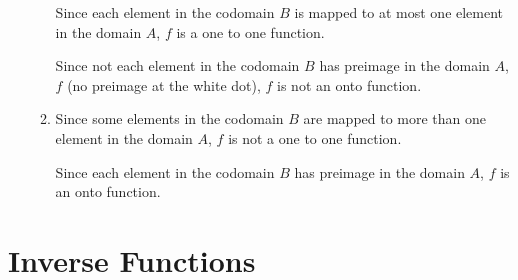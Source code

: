 \documentclass[12pt]{report}
\begin{document}
\begin{enumerate}
\begin{multicols}{2}
\begin{enumerate}
                              Since each element in the codomain $B$ is mapped to at most one element in the
                              domain $A$, $f$ is a one to one function.

                              Since not each element in the codomain $B$ has preimage in the domain $A$, $f$
                              (no preimage at the white dot), $f$ is not an onto function.

                        \item {}
                              \sol{}

                              Since some elements in the codomain $B$ are mapped to more than one element in
                              the domain $A$, $f$ is not a one to one function.

                              Since each element in the codomain $B$ has preimage in the domain $A$, $f$ is
                              an onto function.
                  \end{enumerate}
            \end{multicols}
\end{enumerate}

\newpage

\section{Inverse Functions}
\end{document}
